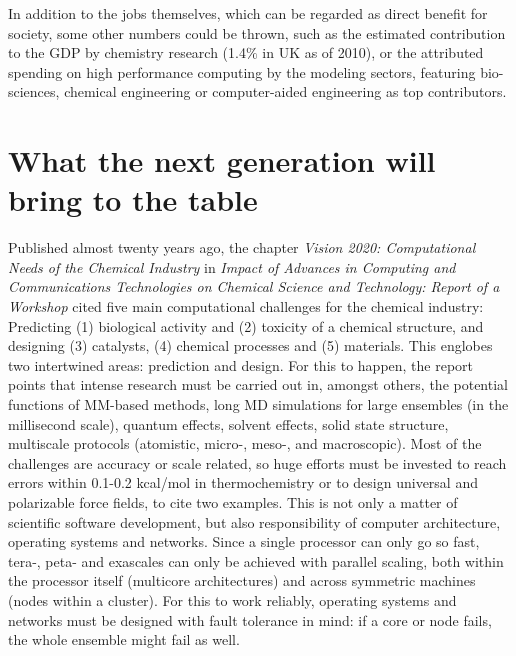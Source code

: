 In addition to the jobs themselves, which can be regarded as direct benefit for society, some other numbers could be thrown, such as the estimated contribution to the GDP by chemistry research (1.4$\%$  in UK as of 2010\cite{UKeconomics}), or the attributed spending on high performance computing by the modeling sectors, featuring bio-sciences, chemical engineering or computer-aided engineering as top contributors.\cite{hpc2020}



\section*{What the next generation will bring to the table}

Published almost twenty years ago, the chapter \textit{Vision 2020: Computational Needs of the Chemical Industry} in \textit{Impact of Advances in Computing and Communications Technologies on Chemical Science and Technology: Report of a Workshop}\cite{vision2020} cited five main computational challenges for the chemical industry: Predicting (1) biological activity and (2) toxicity of a chemical structure, and designing (3) catalysts, (4) chemical processes and (5) materials. This englobes two intertwined areas: prediction and design. For this to happen, the report points that intense research must be carried out in, amongst others, the potential functions of MM-based methods, long MD simulations for large ensembles (in the millisecond scale), quantum effects, solvent effects, solid state structure, multiscale protocols (atomistic, micro-, meso-, and macroscopic). Most of the challenges are accuracy or scale related, so huge efforts must be invested to reach errors within 0.1-0.2 kcal/mol in thermochemistry or to design universal and polarizable force fields, to cite two examples. This is not only a matter of scientific software development, but also responsibility of computer architecture, operating systems and networks. Since a single processor can only go so fast, tera-, peta- and exascales can only be achieved with parallel scaling, both within the processor itself (multicore architectures) and across symmetric machines (nodes within a cluster). For this to work reliably, operating systems and networks must be designed with fault tolerance in mind: if a core or node fails, the whole ensemble might fail as well.

